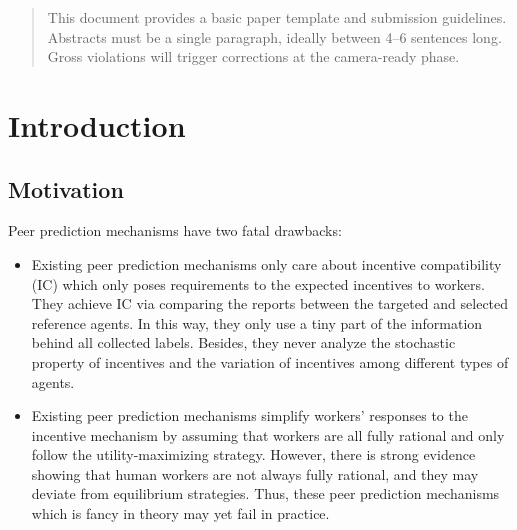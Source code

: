 \documentclass{article}
\begin{document}

\begin{abstract}
This document provides a basic paper template and submission guidelines.
Abstracts must be a single paragraph, ideally between 4--6 sentences long.
Gross violations will trigger corrections at the camera-ready phase.
\end{abstract}

\section{Introduction}
\subsection{Motivation}
Peer prediction mechanisms have two fatal drawbacks:
\begin{itemize}
\item Existing peer prediction mechanisms only care about incentive compatibility (IC) which only poses requirements to the expected incentives to workers. They achieve IC via comparing the reports between the targeted and selected reference agents. In this way, they only use a tiny part of the information behind all collected labels. Besides, they never analyze the stochastic property of incentives and the variation of incentives among different types of agents.
\item Existing peer prediction mechanisms simplify workers' responses to the incentive mechanism by assuming that workers are all fully rational and only follow the utility-maximizing strategy. However, there is strong evidence showing that human workers are not always fully rational, and they may deviate from equilibrium strategies. Thus, these peer prediction mechanisms which is fancy in theory may yet fail in practice.
\end{itemize}
\end{document}
